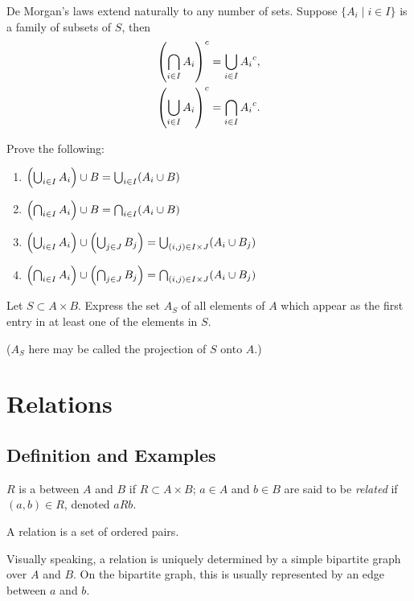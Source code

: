 De Morgan's laws extend naturally to any number of sets. Suppose $\{A_i\mid i\in I\}$ is a family of subsets of $S$, then
\begin{align*}
\left(\bigcap_{i\in I}A_i\right)^c&=\bigcup_{i\in I}{A_i}^c,\\
\left(\bigcup_{i\in I}A_i\right)^c&=\bigcap_{i\in I}{A_i}^c.
\end{align*}

\begin{exercise}
Prove the following:
\begin{enumerate}[label=(\roman*)]
\item $\left(\bigcup_{i\in I}A_i\right)\cup B=\bigcup_{i\in I}(A_i\cup B)$
\item $\left(\bigcap_{i\in I}A_i\right)\cup B=\bigcap_{i\in I}(A_i\cup B)$
\item $\left(\bigcup_{i\in I}A_i\right)\cup\left(\bigcup_{j\in J}B_j\right)=\bigcup_{(i,j)\in I\times J}(A_i\cup B_j)$
\item $\left(\bigcap_{i\in I}A_i\right)\cup\left(\bigcap_{j\in J}B_j\right)=\bigcap_{(i,j)\in I\times J}(A_i\cup B_j)$
\end{enumerate}
\end{exercise}

\begin{exercise}
Let $S\subset A\times B$. Express the set $A_S$ of all elements of $A$ which appear as the first entry in at least one of the elements in $S$.

($A_S$ here may be called the projection of $S$ onto $A$.)
\end{exercise}
\pagebreak

\section{Relations}
\subsection{Definition and Examples}
\begin{definition}[Relation]
$R$ is a  between $A$ and $B$ if $R\subset A\times B$; $a\in A$ and $b\in B$ are said to be \emph{related} if $(a,b)\in R$, denoted $a R b$.
\end{definition}

\begin{remark}
A relation is a set of ordered pairs.
\end{remark}

Visually speaking, a relation is uniquely determined by a simple bipartite graph over $A$ and $B$. On the bipartite graph, this is usually represented by an edge between $a$ and $b$.

